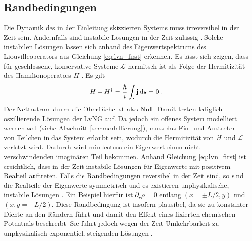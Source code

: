 \subsection{Randbedingungen}
\label{sec:RB}
Die Dynamik des in der Einleitung skizzierten Systems muss irreversibel in der Zeit sein. Andernfalls sind instabile Lösungen in der Zeit zulässig \cite{frensley2}. Solche instabilen Lösungen lassen sich anhand des Eigenwertspektrums des Liouvilleoperators aus Gleichung \eqref{eq:lvn_first} erkennen. Es lässt sich zeigen, dass für geschlossene, konservative Systeme $\mathcal{L}$ hermitsch ist als Folge der Hermitizität des Hamiltonoperators $H$ \cite{frensley2}. Es gilt
\begin{align}
  H- H^{\dagger} = \frac{\hbar}{i}\int_s \vb{j}\mathop{}\!\mathrm{d}\vb{s} = 0 \; .
\end{align}
Der Nettostrom durch die Oberfläche ist also Null. Damit treten lediglich oszillierende Lösungen der LvNG auf. Da jedoch ein offenes System modelliert werden soll (siehe Abschnitt \ref{sec:modellierung}), muss das Ein- und Austreten von Teilchen in das System erlaubt sein, wodurch die Hermitizität von $H$ und $\mathcal{L}$ verletzt wird. Dadurch wird mindestens ein Eigenwert einen nicht-verschwindenden imaginären Teil bekommen. Anhand Gleichung \eqref{eq:lvn_first} ist ersichtlich, dass in der Zeit instabile Lösungen für Eigenwerte mit positivem Realteil auftreten. Falls die Randbedingungen reversibel in der Zeit sind, so sind die Realteile der Eigenwerte symmetrisch und es existieren unphysikalische, instabile Lösungen \cite{frensley2}. Ein Beispiel hierfür ist $\partial_r \rho = 0$ entlang $(x=\pm L/2, y)$ und $(x,y=\pm L/2)$. Diese Randbedingung ist insofern plausibel, da sie zu konstanter Dichte an den Rändern führt und damit den Effekt eines fixierten chemischen Potentials beschreibt. Sie führt jedoch wegen der Zeit-Umkehrbarkeit zu unphysikalisch exponentiell steigenden Lösungen \cite{frensley2}.

